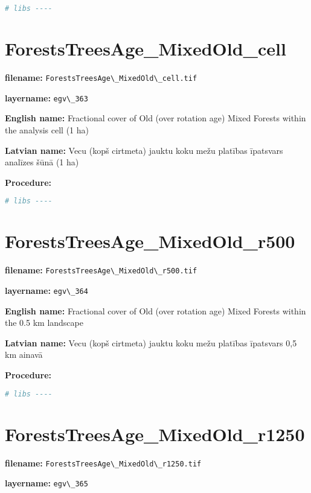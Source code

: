 \documentclass[
]{book}
\newcommand{\passthrough}[1]{#1}
\begin{document}
\begin{lstlisting}[language=R]
# libs ----
\end{lstlisting}

\section{ForestsTreesAge\_MixedOld\_cell}\label{ch06.363}

\textbf{filename:} \passthrough{\lstinline!ForestsTreesAge\_MixedOld\_cell.tif!}

\textbf{layername:} \passthrough{\lstinline!egv\_363!}

\textbf{English name:} Fractional cover of Old (over rotation age) Mixed Forests within the analysis cell (1 ha)

\textbf{Latvian name:} Vecu (kopš cirtmeta) jauktu koku mežu platības īpatsvars analīzes šūnā (1 ha)

\textbf{Procedure:}

\begin{lstlisting}[language=R]
# libs ----
\end{lstlisting}

\section{ForestsTreesAge\_MixedOld\_r500}\label{ch06.364}

\textbf{filename:} \passthrough{\lstinline!ForestsTreesAge\_MixedOld\_r500.tif!}

\textbf{layername:} \passthrough{\lstinline!egv\_364!}

\textbf{English name:} Fractional cover of Old (over rotation age) Mixed Forests within the 0.5 km landscape

\textbf{Latvian name:} Vecu (kopš cirtmeta) jauktu koku mežu platības īpatsvars 0,5 km ainavā

\textbf{Procedure:}

\begin{lstlisting}[language=R]
# libs ----
\end{lstlisting}

\section{ForestsTreesAge\_MixedOld\_r1250}\label{ch06.365}

\textbf{filename:} \passthrough{\lstinline!ForestsTreesAge\_MixedOld\_r1250.tif!}

\textbf{layername:} \passthrough{\lstinline!egv\_365!}
\end{document}
